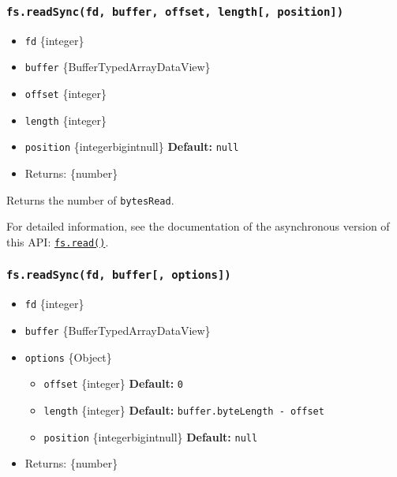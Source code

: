 \subsubsection{\texorpdfstring{\texttt{fs.readSync(fd,\ buffer,\ offset,\ length{[},\ position{]})}}{fs.readSync(fd, buffer, offset, length{[}, position{]})}}\label{fs.readsyncfd-buffer-offset-length-position}

\begin{itemize}
\tightlist
\item
  \texttt{fd} \{integer\}
\item
  \texttt{buffer} \{Buffer\textbar TypedArray\textbar DataView\}
\item
  \texttt{offset} \{integer\}
\item
  \texttt{length} \{integer\}
\item
  \texttt{position} \{integer\textbar bigint\textbar null\}
  \textbf{Default:} \texttt{null}
\item
  Returns: \{number\}
\end{itemize}

Returns the number of \texttt{bytesRead}.

For detailed information, see the documentation of the asynchronous
version of this API:
\hyperref[fsreadfd-buffer-offset-length-position-callback]{\texttt{fs.read()}}.

\subsubsection{\texorpdfstring{\texttt{fs.readSync(fd,\ buffer{[},\ options{]})}}{fs.readSync(fd, buffer{[}, options{]})}}\label{fs.readsyncfd-buffer-options}

\begin{itemize}
\tightlist
\item
  \texttt{fd} \{integer\}
\item
  \texttt{buffer} \{Buffer\textbar TypedArray\textbar DataView\}
\item
  \texttt{options} \{Object\}

  \begin{itemize}
  \tightlist
  \item
    \texttt{offset} \{integer\} \textbf{Default:} \texttt{0}
  \item
    \texttt{length} \{integer\} \textbf{Default:}
    \texttt{buffer.byteLength\ -\ offset}
  \item
    \texttt{position} \{integer\textbar bigint\textbar null\}
    \textbf{Default:} \texttt{null}
  \end{itemize}
\item
  Returns: \{number\}
\end{itemize}

